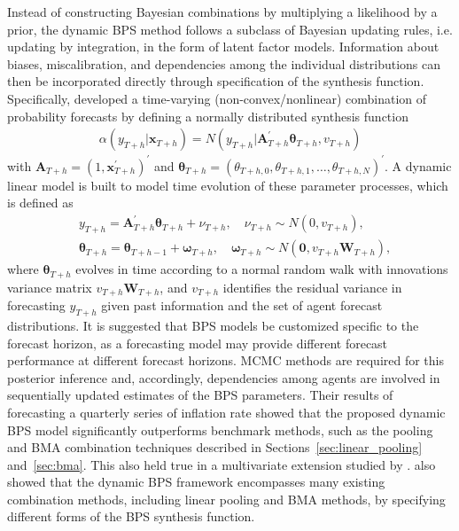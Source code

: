 \documentclass[11pt]{article}
\begin{document}
Instead of constructing Bayesian combinations by multiplying a likelihood by a prior, the dynamic BPS method follows a subclass of Bayesian updating rules, i.e. updating by integration, in the form of latent factor models. Information about biases, miscalibration, and dependencies among the individual distributions can then be incorporated directly through specification of the synthesis function. Specifically, \citet{McAlinn2019-kn} developed a time-varying (non-convex/nonlinear) combination of probability forecasts by defining a normally distributed synthesis function
\begin{align*}
  \alpha\left(y_{T+h} | \bm{x}_{T+h}\right)=N\left(y_{T+h} | \bm{A}_{T+h}^{\prime} \bm{\theta}_{T+h}, v_{T+h}\right)
\end{align*}
with $\bm{A}_{T+h}=\left(1, \bm{x}_{T+h}^{\prime}\right)^{\prime}$ and $\bm{\theta}_{T+h}=\left(\theta_{T+h, 0}, \theta_{T+h, 1}, \dots, \theta_{T+h, N}\right)^{\prime}$. A dynamic linear model is built to model time evolution of these parameter processes, which is defined as
\begin{align*}
   & y_{T+h}=\bm{A}_{T+h}^{\prime} \bm{\theta}_{T+h}+\nu_{T+h}, \quad \nu_{T+h} \sim N\left(0, v_{T+h}\right),                                                         \\
   & \bm{\theta}_{T+h}=\bm{\theta}_{T+h-1}+\bm{\omega}_{T+h}, \quad \bm{\omega}_{T+h} \sim N\left(\bm{0}, v_{T+h} \bm{W}_{T+h}\right),
\end{align*}
where $\bm{\theta}_{T+h}$ evolves in time according to a normal random walk with innovations variance matrix $v_{T+h} \bm{W}_{T+h}$, and $v_{T+h}$ identifies the residual variance in forecasting $y_{T+h}$ given past information and the set of agent forecast distributions. It is suggested that BPS models be customized specific to the forecast horizon, as a forecasting model may provide different forecast performance at different forecast horizons. MCMC methods are required for this posterior inference and, accordingly, dependencies among agents are involved in sequentially updated estimates of the BPS parameters. Their results of forecasting a quarterly series of inflation rate showed that the proposed dynamic BPS model significantly outperforms benchmark methods, such as the pooling and BMA combination techniques described in Sections~\ref{sec:linear_pooling} and~\ref{sec:bma}. This also held true in a multivariate extension studied by \citet{McAlinn2020-qq}. \citet{McAlinn2019-kn} also showed that the dynamic BPS framework encompasses many existing combination methods, including linear pooling and BMA methods, by specifying different forms of the BPS synthesis function.
\end{document}

